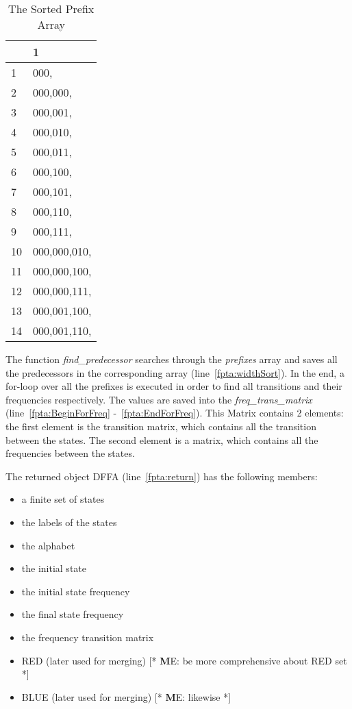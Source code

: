 \documentclass[
a4paper,
12pt
]{scrartcl}
\newcommand{\gray}{\cellcolor{grayself}}  %
\newcommand\me[1]{ [* {\textbf ME:} #1 *]}
\begin{document}
\begin{table}[ht!]
\centering
\begin{tabular}{|l|l|}
\hline
\gray & \gray  1                                 \\ \hline
\gray 1&000,         \\ \hline
\gray 2&000,000,     \\ \hline
\gray 3&000,001,     \\ \hline
\gray 4&000,010,     \\ \hline
\gray 5&000,011,     \\ \hline
\gray 6&000,100,     \\ \hline
\gray 7&000,101,     \\ \hline
\gray 8&000,110,     \\ \hline
\gray 9&000,111,     \\ \hline
\gray 10&000,000,010, \\ \hline
\gray 11&000,000,100, \\ \hline
\gray 12&000,000,111, \\ \hline
\gray 13&000,001,100, \\ \hline
\gray 14&000,001,110, \\ \hline
\end{tabular}
\caption{The Sorted Prefix Array}
\label{table:sortPrefix}
\end{table}

The function \emph{find\_predecessor} searches through the \emph{prefixes} array and saves all the predecessors in the corresponding array (line~\ref{fpta:widthSort}). In the end, a for-loop over all the prefixes is executed in order to find all transitions and their frequencies respectively. The values are saved into the \emph{freq\_trans\_matrix}  (line~\ref{fpta:BeginForFreq} -~\ref{fpta:EndForFreq}). This Matrix contains 2 elements: the first element is the transition matrix, which contains all the transition between the states. The second element is a matrix, which contains all the frequencies between the states.

The returned object DFFA (line~\ref{fpta:return}) has the following members:
\begin{itemize}
      \item a finite set of states
      \item the labels of the states
      \item the alphabet
      \item the initial state
      \item the initial state frequency
      \item the final state frequency
      \item the frequency transition matrix
      \item RED (later used for merging) \me{be more comprehensive about RED set}
      \item BLUE (later used for merging) \me{likewise}
   \end{itemize}
\end{document}

